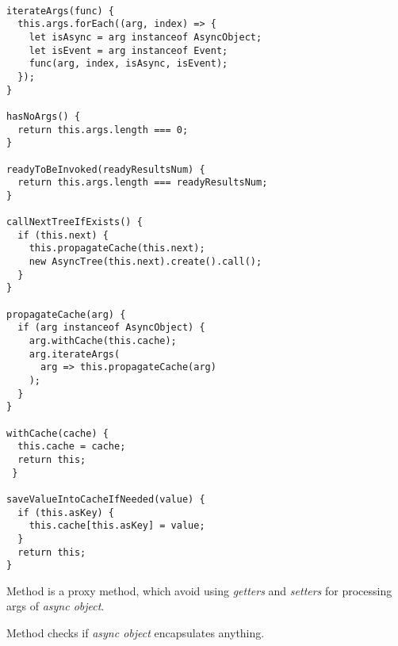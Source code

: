 \documentclass{article}
\newcommand{\cit}[1]{{\fontfamily{qcr}\selectfont{\textit{\textbf{\textcolor{darkgray}{#1}}}}}}
\begin{document}
\begin{lstlisting}

iterateArgs(func) {
  this.args.forEach((arg, index) => {
    let isAsync = arg instanceof AsyncObject;
    let isEvent = arg instanceof Event;
    func(arg, index, isAsync, isEvent);
  });
}

hasNoArgs() {
  return this.args.length === 0;
}

readyToBeInvoked(readyResultsNum) {
  return this.args.length === readyResultsNum;
}

callNextTreeIfExists() {
  if (this.next) {
    this.propagateCache(this.next);
    new AsyncTree(this.next).create().call();
  }
}

propagateCache(arg) {
  if (arg instanceof AsyncObject) {
    arg.withCache(this.cache);
    arg.iterateArgs(
      arg => this.propagateCache(arg)
    );
  }
}

withCache(cache) {
  this.cache = cache;
  return this;
 }
 
saveValueIntoCacheIfNeeded(value) {
  if (this.asKey) {
    this.cache[this.asKey] = value;
  }
  return this;
}

\end{lstlisting}

Method \cit{iterateArgs} is a proxy method, which avoid using \textit{getters} and \textit{setters} for processing args of \textit{async object}.

Method \cit{hasNoArgs} checks if \textit{async object} encapsulates anything.
\end{document}
